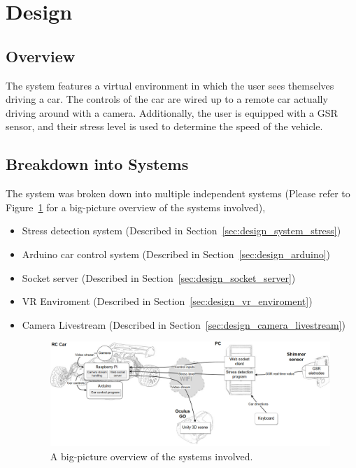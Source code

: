 \section{Design}\label{sec:design}

\subsection{Overview}\label{sec:design_overview}

The system features a virtual environment in which the user sees themselves
driving a car. The controls of the car are wired up to a remote car actually
driving around with a camera. Additionally, the user is equipped with a GSR
sensor, and their stress level is used to determine the speed of the vehicle.

\subsection{Breakdown into Systems}\label{sec:design_systems}

The system was broken down into multiple independent systems (Please refer to
Figure~\ref{fig:systems} for a big-picture overview of the systems involved),

\begin{itemize}
\item Stress detection system (Described in Section~\ref{sec:design_system_stress})%
\item Arduino car control system (Described in
Section~\ref{sec:design_arduino})%
\item Socket server (Described in Section~\ref{sec:design_socket_server})
\item VR Enviroment (Described in Section~\ref{sec:design_vr_enviroment})
\item Camera Livestream (Described in Section~\ref{sec:design_camera_livestream})

\begin{figure}
  \centering
  \includegraphics[width=\textwidth]{system_design_scheme/system_design_sketch.jpg}
  \caption{\label{fig:systems} A big-picture overview of the systems
  involved.}
\end{figure}

\end{itemize}

